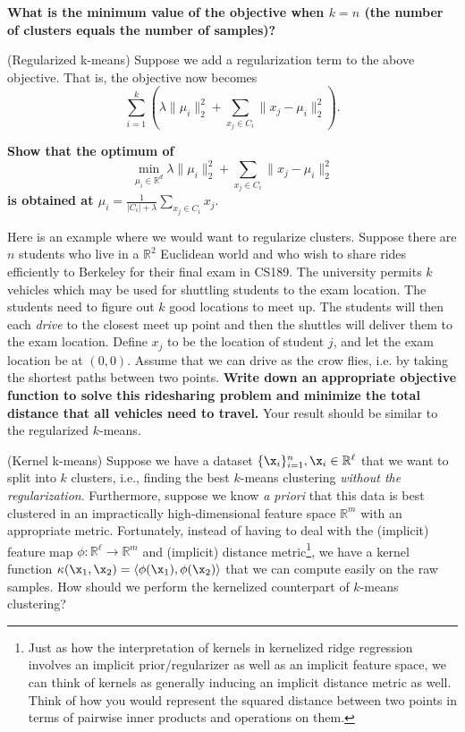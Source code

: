 \documentclass[preview]{standalone}
\begin{document}
\begin{Parts}

\Part \textbf{What is the minimum value of the objective when $k=n$ (the number
of clusters equals the number of samples)?}



\Part (Regularized k-means) Suppose we add a regularization term to the above
objective. That is, the objective now becomes $$\sum_{i=1}^k \left( \lambda
\|\mu_i\|_2^2 +  {\sum_{x_j \in C_i}{\|x_j - \mu_i\|_2^2}} \right).$$

{\bf Show that the optimum of
$$\min_{\mu_i\in\mathbb R^d} \lambda \|\mu_i\|_2^2 + \sum_{x_j \in C_i}{\|x_j - \mu_i\|_2^2}$$
is obtained at $\mu_i = \frac 1 {|C_i|+ \lambda} \sum_{x_j\in C_i} x_j.$}



\Part Here is an example where we would want to regularize clusters. Suppose
there are $n$ students who live in a $\mathbb{R}^2$ Euclidean world and who
wish to share rides efficiently to Berkeley for their final exam in CS189. The
university permits $k$ vehicles which may be used for shuttling students to the
exam location. The students need to figure out $k$ good locations to meet up.
The students will then each \emph{drive} to the closest meet up point and then
the shuttles will deliver them to the exam location. Define $x_j$ to be the
location of student $j$, and let the exam location be at $(0,0)$. Assume that
we can drive as the crow flies, i.e. by taking the shortest paths between two
points. \textbf{Write down an appropriate objective function to solve this
ridesharing problem and minimize the total distance that all vehicles need to
travel.} Your result should be similar to the regularized $k$-means.

\Part (Kernel k-means) Suppose we have a dataset $\{\x_i\}_{i=1}^n, \x_i \in
\mathbb{R}^{\ell}$ that we want to split into $k$ clusters, i.e., finding the best
$k$-means clustering \emph{without the regularization}.  Furthermore, suppose
we know {\em a priori} that this data is best clustered in an impractically
high-dimensional feature space $\mathbb{R}^m$ with an appropriate
metric. Fortunately, instead of having to deal with the (implicit)
feature map $\phi : \mathbb{R}^{\ell} \rightarrow \mathbb{R}^m$ and
(implicit) distance metric\footnote{Just as how the interpretation of
  kernels in kernelized ridge regression involves an implicit
  prior/regularizer as well as an implicit feature space, we can think
  of kernels as generally inducing an implicit distance metric as well. Think of
how you would represent the squared distance between two points in terms of
pairwise inner products and operations on them.}, we have a kernel function
$\kappa(\x_1,\x_2) = \langle \phi(\x_1) , \phi(\x_2)\rangle$ that we
can compute easily on the raw samples. How should we perform the
kernelized counterpart of $k$-means clustering?


\end{Parts}
\end{document}
